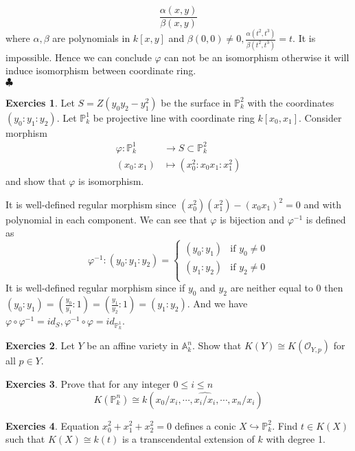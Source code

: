 \documentclass[12pt,a4paper]{article}
\theoremstyle{definition}
\newtheorem{exer}{Exercies}[subsection]
\newcommand*{\qeds}{\hfill\ensuremath{\clubsuit}}
\begin{document}
\[
\frac{\alpha(x,y)}{\beta(x,y)}
\]
where $\alpha ,\beta$ are polynomials in $k[x,y]$ and $\beta(0,0) \neq 0, \frac{\alpha(t^2,t^3)}{\beta(t^2,t^3)} = t$. It is impossible.
Hence we can conclude $\varphi$ can not be an isomorphism otherwise it will induce isomorphism between coordinate ring. \\ \qeds
\begin{exer}
	Let $S= Z(y_0 y_2 - y_1^2)$ be the surface in $\mathbb{P}^2_k$ with the coordinates $(y_0:y_1:y_2)$. Let $\mathbb{P}^1_k$ be projective line with coordinate ring $k[x_0,x_1]$. Consider morphism \[
	\begin{aligned}
	\varphi: \mathbb{P}^1_k &\to S \subset \mathbb{P}^2_k\\
	(x_0:x_1) &\mapsto (x_0^2: x_0x_1: x_1^2)
	\end{aligned}\] and show that $\varphi$ is isomorphism.
\end{exer}
It is well-defined regular morphism since $(x_0^2)(x_1^2) - (x_0 x_1)^2=0$ and with polynomial in each component. We can see that $\varphi$ is bijection and $\varphi^{-1}$ is defined as
\[
\varphi^{-1} \colon (y_0:y_1:y_2) =\begin{cases}
(y_0: y_1)& \text{if } y_0 \neq 0\\
(y_1: y_2)& \text{if } y_2 \neq 0\\
\end{cases} 
\]
It is well-defined regular morphism since if $y_0$ and $y_2$ are neither equal to $0$ then $(y_0: y_1) = (\frac{y_0}{y_1}:1) = (\frac{y_1}{y_2}:1) = (y_1:y_2)$. And we have $\varphi \circ \varphi^{-1} = id_{S}, \varphi^{-1} \circ \varphi = id_{\mathbb{P}^1_k}$.
\begin{exer}
	Let $Y$ be an affine variety in $\mathbb{A}^n_k$. Show that $K(Y) \cong K(\mathcal{O}_{Y,p})$ for all $p \in Y$.
\end{exer}
\begin{exer}
	Prove that for any integer $0 \leq i \leq n$
	\[
	K(\mathbb{P}^n_k) \cong k(x_0/x_i, \cdots, \widehat{x_i/x_i}, \cdots, x_n/x_i)
	\]
\end{exer}
\begin{exer}
	Equation $x_0^2 + x_1^2 + x_2^2=0$ defines a conic $X \hookrightarrow \mathbb{P}_k^2$. Find $t \in K(X)$ such that $K(X) \cong k(t)$ is a transcendental extension of $k$ with degree 1.
\end{exer}
\end{document}
